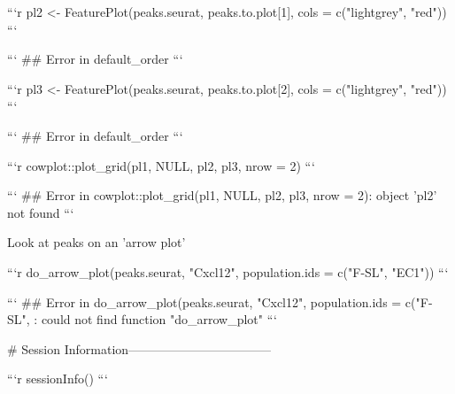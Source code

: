 ```r
pl2 <- FeaturePlot(peaks.seurat, peaks.to.plot[1], cols = c("lightgrey", "red"))
```

```
## Error in default_order %
```

```r
pl3 <- FeaturePlot(peaks.seurat, peaks.to.plot[2], cols = c("lightgrey", "red"))
```

```
## Error in default_order %
```

```r
cowplot::plot_grid(pl1, NULL, pl2, pl3, nrow = 2)
```

```
## Error in cowplot::plot_grid(pl1, NULL, pl2, pl3, nrow = 2): object 'pl2' not found
```

Look at peaks on an 'arrow plot'

```r
do_arrow_plot(peaks.seurat, "Cxcl12", population.ids = c("F-SL", "EC1"))
```

```
## Error in do_arrow_plot(peaks.seurat, "Cxcl12", population.ids = c("F-SL", : could not find function "do_arrow_plot"
```



# Session Information-----------------------------------


```r
sessionInfo()
```

